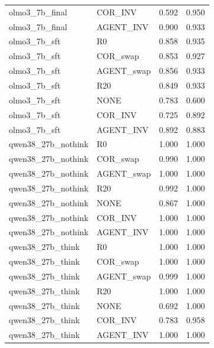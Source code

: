 \begin{small}
\begin{tabular}{llrr}
olmo3\_7b\_final & COR\_INV & 0.592 & 0.950 \\
olmo3\_7b\_final & AGENT\_INV & 0.900 & 0.933 \\
olmo3\_7b\_sft & R0 & 0.858 & 0.935 \\
olmo3\_7b\_sft & COR\_swap & 0.853 & 0.927 \\
olmo3\_7b\_sft & AGENT\_swap & 0.856 & 0.933 \\
olmo3\_7b\_sft & R20 & 0.849 & 0.933 \\
olmo3\_7b\_sft & NONE & 0.783 & 0.600 \\
olmo3\_7b\_sft & COR\_INV & 0.725 & 0.892 \\
olmo3\_7b\_sft & AGENT\_INV & 0.892 & 0.883 \\
qwen38\_27b\_nothink & R0 & 1.000 & 1.000 \\
qwen38\_27b\_nothink & COR\_swap & 0.990 & 1.000 \\
qwen38\_27b\_nothink & AGENT\_swap & 1.000 & 1.000 \\
qwen38\_27b\_nothink & R20 & 0.992 & 1.000 \\
qwen38\_27b\_nothink & NONE & 0.867 & 1.000 \\
qwen38\_27b\_nothink & COR\_INV & 1.000 & 1.000 \\
qwen38\_27b\_nothink & AGENT\_INV & 1.000 & 1.000 \\
qwen38\_27b\_think & R0 & 1.000 & 1.000 \\
qwen38\_27b\_think & COR\_swap & 1.000 & 1.000 \\
qwen38\_27b\_think & AGENT\_swap & 0.999 & 1.000 \\
qwen38\_27b\_think & R20 & 1.000 & 1.000 \\
qwen38\_27b\_think & NONE & 0.692 & 1.000 \\
qwen38\_27b\_think & COR\_INV & 0.783 & 0.958 \\
qwen38\_27b\_think & AGENT\_INV & 1.000 & 1.000 \\
\bottomrule
\end{tabular}\end{small}
